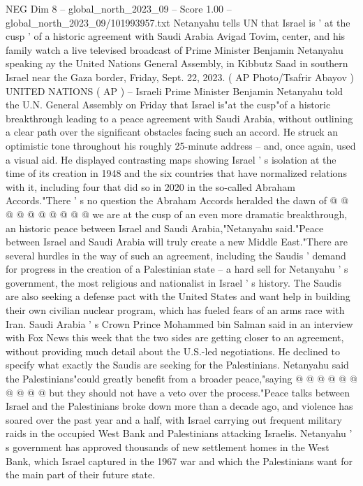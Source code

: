 \begin{textsample}{NEG Dim 8 – global\_north\_2023\_09 – Score 1.00 – global\_north\_2023\_09/101993957.txt}  \label{ex:f8_neg_323}
Netanyahu tells UN that Israel is ' at the cusp ' of a historic agreement with Saudi Arabia Avigad Tovim, center, and his family watch a live televised broadcast of Prime Minister Benjamin Netanyahu speaking ay the United Nations General Assembly, in Kibbutz Saad in southern Israel near the Gaza border, Friday, Sept. 22, 2023. ( AP Photo/Tsafrir Abayov ) UNITED NATIONS ( AP ) -- Israeli Prime Minister Benjamin Netanyahu told the U.N.
General Assembly on Friday that Israel is"at the cusp"of a historic breakthrough leading to a peace agreement with Saudi Arabia, without outlining a clear path over the significant obstacles facing such an accord.
He struck an optimistic tone throughout his roughly 25-minute address -- and, once again, used a visual aid.
He displayed contrasting maps showing Israel ' s isolation at the time of its creation in 1948 and the six countries that have normalized relations with it, including four that did so in 2020 in the so-called Abraham Accords."There ' s no question the Abraham Accords heralded the dawn of @ @ @ @ @ @ @ @ @ @ we are at the cusp of an even more dramatic breakthrough, an historic peace between Israel and Saudi Arabia,"Netanyahu said."Peace between Israel and Saudi Arabia will truly create a new Middle East."There are several hurdles in the way of such an agreement, including the Saudis ' demand for progress in the creation of a Palestinian state -- a hard sell for Netanyahu ' s government, the most religious and nationalist in Israel ' s history.
The Saudis are also seeking a defense pact with the United States and want help in building their own civilian nuclear program, which has fueled fears of an arms race with Iran.
Saudi Arabia ' s Crown Prince Mohammed bin Salman said in an interview with Fox News this week that the two sides are getting closer to an agreement, without providing much detail about the U.S.-led negotiations.
He declined to specify what exactly the Saudis are seeking for the Palestinians.
Netanyahu said the Palestinians"could greatly benefit from a broader peace,"saying @ @ @ @ @ @ @ @ @ @ but they should not have a veto over the process."Peace talks between Israel and the Palestinians broke down more than a decade ago, and violence has soared over the past year and a half, with Israel carrying out frequent military raids in the occupied West Bank and Palestinians attacking Israelis.
Netanyahu ' s government has approved thousands of new settlement homes in the West Bank, which Israel captured in the 1967 war and which the Palestinians want for the main part of their future state.

\end{textsample}
